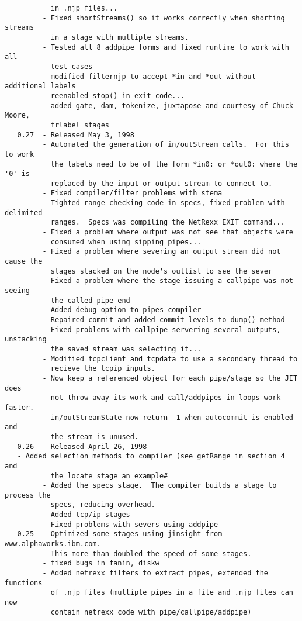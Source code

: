 \begin{verbatim}
           in .njp files...
         - Fixed shortStreams() so it works correctly when shorting streams
           in a stage with multiple streams.
         - Tested all 8 addpipe forms and fixed runtime to work with all
           test cases
         - modified filternjp to accept *in and *out without additional labels
         - reenabled stop() in exit code...
         - added gate, dam, tokenize, juxtapose and courtesy of Chuck Moore,
           frlabel stages
   0.27  - Released May 3, 1998
         - Automated the generation of in/outStream calls.  For this to work
           the labels need to be of the form *in0: or *out0: where the '0' is
           replaced by the input or output stream to connect to.
         - Fixed compiler/filter problems with stema
         - Tighted range checking code in specs, fixed problem with delimited
           ranges.  Specs was compiling the NetRexx EXIT command...
         - Fixed a problem where output was not see that objects were
           consumed when using sipping pipes...
         - Fixed a problem where severing an output stream did not cause the
           stages stacked on the node's outlist to see the sever
         - Fixed a problem where the stage issuing a callpipe was not seeing
           the called pipe end
         - Added debug option to pipes compiler
         - Repaired commit and added commit levels to dump() method
         - Fixed problems with callpipe servering several outputs, unstacking
           the saved stream was selecting it...
         - Modified tcpclient and tcpdata to use a secondary thread to
           recieve the tcpip inputs.
         - Now keep a referenced object for each pipe/stage so the JIT does
           not throw away its work and call/addpipes in loops work faster.
         - in/outStreamState now return -1 when autocommit is enabled and
           the stream is unused.
   0.26  - Released April 26, 1998
   - Added selection methods to compiler (see getRange in section 4 and
           the locate stage an example#
         - Added the specs stage.  The compiler builds a stage to process the
           specs, reducing overhead.
         - Added tcp/ip stages
         - Fixed problems with severs using addpipe
   0.25  - Optimized some stages using jinsight from www.alphaworks.ibm.com.
           This more than doubled the speed of some stages.
         - fixed bugs in fanin, diskw
         - Added netrexx filters to extract pipes, extended the functions
           of .njp files (multiple pipes in a file and .njp files can now
           contain netrexx code with pipe/callpipe/addpipe)

\end{verbatim}
